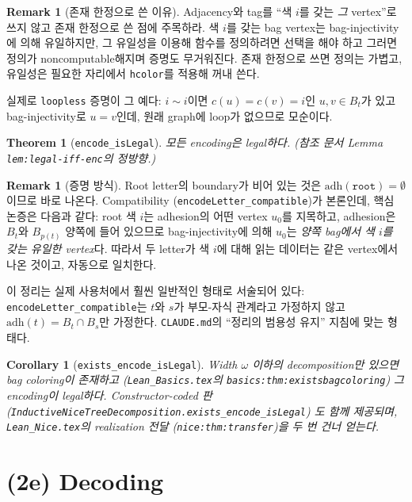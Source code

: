 \documentclass[11pt]{article}
\theoremstyle{definition}
\newtheorem{remark}[definition]{Remark}
\theoremstyle{plain}
\newtheorem{theorem}[definition]{Theorem}
\newtheorem{corollary}[definition]{Corollary}
\newcommand{\lean}[1]{\texttt{#1}}
\newcommand{\leanfile}[1]{\texttt{#1}}
\newcommand{\adh}{\mathrm{adh}}
\begin{document}
\begin{remark}[존재 한정으로 쓴 이유]
Adjacency와 tag를 ``색 $i$를 갖는 \emph{그} vertex''로 쓰지 않고 존재
한정으로 쓴 점에 주목하라. 색 $i$를 갖는 bag vertex는 bag-injectivity에 의해
유일하지만, 그 유일성을 이용해 함수를 정의하려면 선택을 해야 하고 그러면
정의가 noncomputable해지며 증명도 무거워진다. 존재 한정으로 쓰면 정의는
가볍고, 유일성은 필요한 자리에서 \lean{hcolor}를 적용해 꺼내 쓴다.

실제로 \lean{loopless} 증명이 그 예다: $i \sim i$이면 $c(u)=c(v)=i$인
$u,v \in B_t$가 있고 bag-injectivity로 $u=v$인데, 원래 graph에 loop가 없으므로
모순이다.
\end{remark}

\begin{theorem}[\lean{encode\_isLegal}]
\label{mso:thm:encodeislegal}
모든 encoding은 legal하다. (참조 문서 Lemma \lean{lem:legal-iff-enc}의
정방향.)
\end{theorem}

\begin{remark}[증명 방식]
Root letter의 boundary가 비어 있는 것은 $\adh(\lean{root}) = \emptyset$이므로
바로 나온다. Compatibility (\lean{encodeLetter\_compatible})가 본론인데,
핵심 논증은 다음과 같다: root 색 $i$는 adhesion의 어떤 vertex $u_0$를
지목하고, adhesion은 $B_t$와 $B_{p(t)}$ 양쪽에 들어 있으므로 bag-injectivity에
의해 $u_0$는 \emph{양쪽 bag에서 색 $i$를 갖는 유일한 vertex}다. 따라서 두
letter가 색 $i$에 대해 읽는 데이터는 같은 vertex에서 나온 것이고, 자동으로
일치한다.

이 정리는 실제 사용처에서 훨씬 일반적인 형태로 서술되어 있다:
\lean{encodeLetter\_compatible}는 $t$와 $s$가 부모-자식 관계라고 가정하지 않고
$\adh(t) = B_t \cap B_s$만 가정한다. \leanfile{CLAUDE.md}의 ``정리의 범용성
유지'' 지침에 맞는 형태다.
\end{remark}

\begin{corollary}[\lean{exists\_encode\_isLegal}]
\label{mso:cor:existsencode}
Width $\omega$ 이하의 decomposition만 있으면 bag coloring이 존재하고
(\leanfile{Lean\_Basics.tex}의 \lean{basics:thm:existsbagcoloring}) 그 encoding이
legal하다. Constructor-coded 판
(\lean{InductiveNiceTreeDecomposition.exists\_encode\_isLegal}) 도 함께
제공되며, \leanfile{Lean\_Nice.tex}의 realization 전달
(\lean{nice:thm:transfer})을 두 번 건너 얻는다.
\end{corollary}

\section{(2e) Decoding}
\label{mso:sec:decoding}
\end{document}
